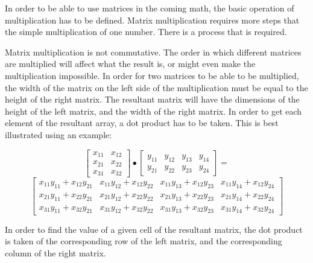 \documentclass{article}
\begin{document}
	In order to be able to use matrices in the coming math, the basic operation of multiplication has to be defined. Matrix multiplication requires more steps that the simple multiplication of one number. There is a process that is required. \par

	Matrix multiplication is not commutative. The order in which different matrices are multiplied will affect what the result is, or might even make the multiplication impossible. In order for two matrices to be able to be multiplied, the width of the matrix on the left side of the multiplication must be equal to the height of the right matrix. The resultant matrix will have the dimensions of the height of the left matrix, and the width of the right matrix. In order to get each element of the resultant array, a dot product has to be taken. This is best illustrated using an example: \par

	\[
		\begin{bmatrix}
			x_{11} & x_{12} \\
			x_{21} & x_{22} \\
			x_{31} & x_{32}
		\end{bmatrix}
		\bullet
		\begin{bmatrix}
			y_{11} & y_{12} & y_{13} & y_{14} \\
			y_{21} & y_{22} & y_{23} & y_{24}
		\end{bmatrix}
		=
	\]
	\[
		\begin{bmatrix}
			x_{11} y_{11} + x_{12} y_{21} & x_{11} y_{12} + x_{12} y_{22} & x_{11} y_{13} + x_{12} y_{23} & x_{11} y_{14} + x_{12} y_{24} \\
			x_{21} y_{11} + x_{22} y_{21} & x_{21} y_{12} + x_{22} y_{22} & x_{21} y_{13} + x_{22} y_{23} & x_{21} y_{14} + x_{22} y_{24} \\
			x_{31} y_{11} + x_{32} y_{21} & x_{31} y_{12} + x_{32} y_{22} & x_{31} y_{13} + x_{32} y_{23} & x_{31} y_{14} + x_{32} y_{24}
		\end{bmatrix}
	\]

	In order to find the value of a given cell of the resultant matrix, the dot product is taken of the corresponding row of the left matrix, and the corresponding column of the right matrix. \par
\end{document}
